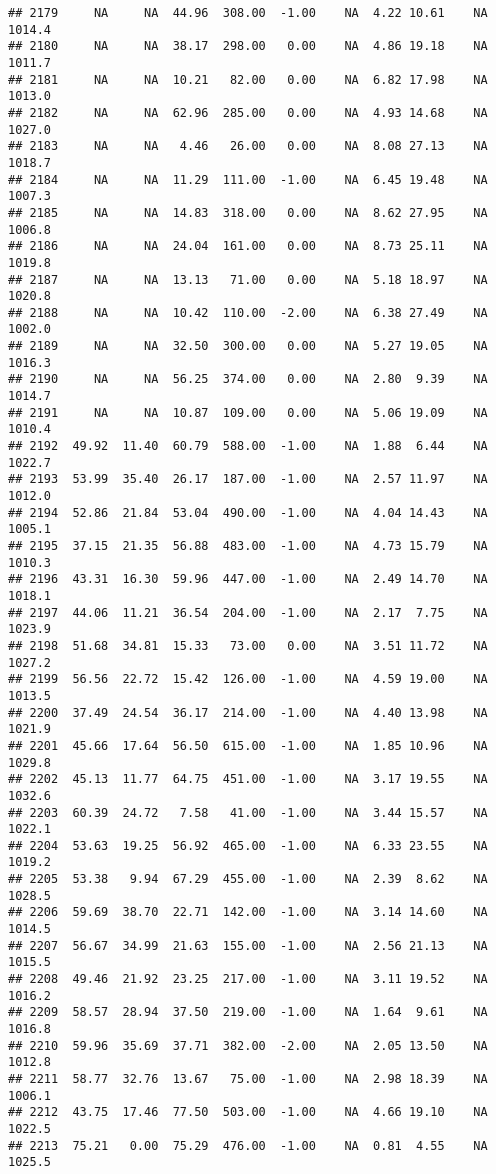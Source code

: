 \documentclass{article}\usepackage{graphicx, color}
\makeatletter
\newenvironment{kframe}{%
 \def\at@end@of@kframe{}%
 \ifinner\ifhmode%
  \def\at@end@of@kframe{\end{minipage}}%
  \begin{minipage}{\columnwidth}%
 \fi\fi%
 \def\FrameCommand##1{\hskip\@totalleftmargin \hskip-\fboxsep
 \colorbox{shadecolor}{##1}\hskip-\fboxsep
     \hskip-\linewidth \hskip-\@totalleftmargin \hskip\columnwidth}%
 \MakeFramed {\advance\hsize-\width
   \@totalleftmargin\z@ \linewidth\hsize
   \@setminipage}}%
 {\par\unskip\endMakeFramed%
 \at@end@of@kframe}
\newenvironment{knitrout}{}{} %
\makeatother
\begin{document}
\begin{knitrout}
\begin{kframe}
\begin{verbatim}
## 2179     NA     NA  44.96  308.00  -1.00    NA  4.22 10.61    NA 1014.4
## 2180     NA     NA  38.17  298.00   0.00    NA  4.86 19.18    NA 1011.7
## 2181     NA     NA  10.21   82.00   0.00    NA  6.82 17.98    NA 1013.0
## 2182     NA     NA  62.96  285.00   0.00    NA  4.93 14.68    NA 1027.0
## 2183     NA     NA   4.46   26.00   0.00    NA  8.08 27.13    NA 1018.7
## 2184     NA     NA  11.29  111.00  -1.00    NA  6.45 19.48    NA 1007.3
## 2185     NA     NA  14.83  318.00   0.00    NA  8.62 27.95    NA 1006.8
## 2186     NA     NA  24.04  161.00   0.00    NA  8.73 25.11    NA 1019.8
## 2187     NA     NA  13.13   71.00   0.00    NA  5.18 18.97    NA 1020.8
## 2188     NA     NA  10.42  110.00  -2.00    NA  6.38 27.49    NA 1002.0
## 2189     NA     NA  32.50  300.00   0.00    NA  5.27 19.05    NA 1016.3
## 2190     NA     NA  56.25  374.00   0.00    NA  2.80  9.39    NA 1014.7
## 2191     NA     NA  10.87  109.00   0.00    NA  5.06 19.09    NA 1010.4
## 2192  49.92  11.40  60.79  588.00  -1.00    NA  1.88  6.44    NA 1022.7
## 2193  53.99  35.40  26.17  187.00  -1.00    NA  2.57 11.97    NA 1012.0
## 2194  52.86  21.84  53.04  490.00  -1.00    NA  4.04 14.43    NA 1005.1
## 2195  37.15  21.35  56.88  483.00  -1.00    NA  4.73 15.79    NA 1010.3
## 2196  43.31  16.30  59.96  447.00  -1.00    NA  2.49 14.70    NA 1018.1
## 2197  44.06  11.21  36.54  204.00  -1.00    NA  2.17  7.75    NA 1023.9
## 2198  51.68  34.81  15.33   73.00   0.00    NA  3.51 11.72    NA 1027.2
## 2199  56.56  22.72  15.42  126.00  -1.00    NA  4.59 19.00    NA 1013.5
## 2200  37.49  24.54  36.17  214.00  -1.00    NA  4.40 13.98    NA 1021.9
## 2201  45.66  17.64  56.50  615.00  -1.00    NA  1.85 10.96    NA 1029.8
## 2202  45.13  11.77  64.75  451.00  -1.00    NA  3.17 19.55    NA 1032.6
## 2203  60.39  24.72   7.58   41.00  -1.00    NA  3.44 15.57    NA 1022.1
## 2204  53.63  19.25  56.92  465.00  -1.00    NA  6.33 23.55    NA 1019.2
## 2205  53.38   9.94  67.29  455.00  -1.00    NA  2.39  8.62    NA 1028.5
## 2206  59.69  38.70  22.71  142.00  -1.00    NA  3.14 14.60    NA 1014.5
## 2207  56.67  34.99  21.63  155.00  -1.00    NA  2.56 21.13    NA 1015.5
## 2208  49.46  21.92  23.25  217.00  -1.00    NA  3.11 19.52    NA 1016.2
## 2209  58.57  28.94  37.50  219.00  -1.00    NA  1.64  9.61    NA 1016.8
## 2210  59.96  35.69  37.71  382.00  -2.00    NA  2.05 13.50    NA 1012.8
## 2211  58.77  32.76  13.67   75.00  -1.00    NA  2.98 18.39    NA 1006.1
## 2212  43.75  17.46  77.50  503.00  -1.00    NA  4.66 19.10    NA 1022.5
## 2213  75.21   0.00  75.29  476.00  -1.00    NA  0.81  4.55    NA 1025.5

\end{verbatim}
\end{kframe}
\end{knitrout}
\end{document}
